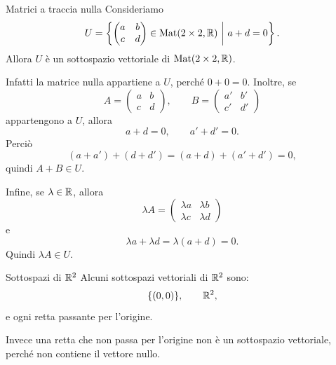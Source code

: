 \documentclass[a4paper]{article}
\begin{document}
\begin{snippetexample}{Matrici a traccia nulla}
    Consideriamo
    \[
        U=
        \left\{
            \begin{pmatrix}
                a & b\\
                c & d
            \end{pmatrix}
            \in\operatorname{Mat}(2\times 2,\mathbb{R})
            \ \middle|\
            a+d=0
        \right\}.
    \]
    Allora \(U\) è un sottospazio vettoriale di \(\operatorname{Mat}(2\times 2,\mathbb{R})\).

    Infatti la matrice nulla appartiene a \(U\), perché \(0+0=0\). Inoltre, se
    \[
        A=
        \begin{pmatrix}
            a & b\\
            c & d
        \end{pmatrix},
        \qquad
        B=
        \begin{pmatrix}
            a' & b'\\
            c' & d'
        \end{pmatrix}
    \]
    appartengono a \(U\), allora
    \[
        a+d=0,
        \qquad
        a'+d'=0.
    \]
    Perciò
    \[
        (a+a')+(d+d')=(a+d)+(a'+d')=0,
    \]
    quindi \(A+B\in U\).

    Infine, se \(\lambda\in\mathbb{R}\), allora
    \[
        \lambda A=
        \begin{pmatrix}
            \lambda a & \lambda b\\
            \lambda c & \lambda d
        \end{pmatrix}
    \]
    e
    \[
        \lambda a+\lambda d=\lambda(a+d)=0.
    \]
    Quindi \(\lambda A\in U\).
\end{snippetexample}

\begin{snippetexample}{Sottospazi di \(\mathbb{R}^2\)}
    Alcuni sottospazi vettoriali di \(\mathbb{R}^2\) sono:
    \[
        \{(0,0)\},
        \qquad
        \mathbb{R}^2,
    \]
    e ogni retta passante per l'origine.

    Invece una retta che non passa per l'origine non è un sottospazio vettoriale, perché non contiene il vettore nullo.
    \begin{center}
    \end{center}
\end{snippetexample}
\end{document}
